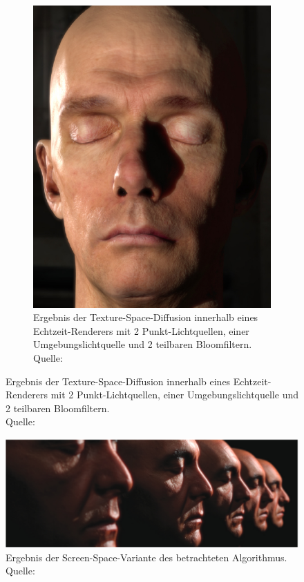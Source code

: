 \documentclass[ngerman,runningheads,a4paper]{llncs}[2018/03/10]
\begin{document}
\begin{figure}
\begin{subfigure}{.5\textwidth}
    \includegraphics[scale=0.25,keepaspectratio]{./images/nvidia-result.jpg}
    \caption{Ergebnis der Texture-Space-Diffusion innerhalb eines Echtzeit-Renderers mit 2 Punkt-Lichtquellen, einer Umgebungslichtquelle und 2 teilbaren Bloomfiltern.
    \\\hspace{\textwidth}Quelle: \cite{efficient-human-skin-rendering}}
    \label{fig:outlook-final-result}
  \end{subfigure}
\end{figure}

\begin{figure}
  \centering
  \includegraphics[scale=0.275,keepaspectratio]{./images/screen-space-sss.jpg}
  \caption{Ergebnis der Screen-Space-Variante des betrachteten Algorithmus.\\\hspace{\textwidth}Quelle: \citet{screen-space-subsurface}}
  \label{fig:outlook-ssss}
\end{figure}
\end{document}
